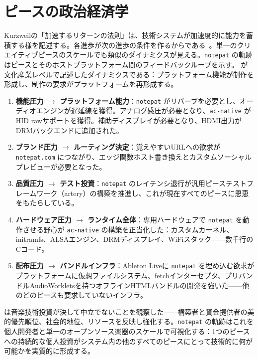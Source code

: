 \documentclass[10pt,letterpaper,twocolumn]{article}
\begin{document}
\section{ピースの政治経済学}

Kurzweilの「加速するリターンの法則」は、技術システムが加速度的に能力を蓄積する様を記述する。各進歩が次の進歩の条件を作るからである~\citep{kurzweil2005singularity}。単一のクリエイティブピースのスケールでも類似のダイナミクスが見える。\texttt{notepat} の軌跡はピースとそのホストプラットフォーム間のフィードバックループを示す。\citet{nieborg2018platformization} が文化産業レベルで記述したダイナミクスである：プラットフォーム機能が制作を形成し、制作の要求がプラットフォームを再形成する。

\begin{enumerate}
  \item \textbf{機能圧力 $\rightarrow$ プラットフォーム能力}：\texttt{notepat} がリバーブを必要とし、オーディオエンジンが遅延線を獲得。アナログ感圧が必要となり、\texttt{ac-native} がHID rawサポートを獲得。補助ディスプレイが必要となり、HDMI出力がDRMバックエンドに追加された。
  \item \textbf{ブランド圧力 $\rightarrow$ ルーティング決定}：覚えやすいURLへの欲求が \texttt{notepat.com} につながり、エッジ関数ホスト書き換えとカスタムソーシャルプレビューが必要となった。
  \item \textbf{品質圧力 $\rightarrow$ テスト投資}：\texttt{notepat} のレイテンシ退行が汎用ピーステストフレームワーク（artery）の構築を推進し、これが現在すべてのピースに恩恵をもたらしている。
  \item \textbf{ハードウェア圧力 $\rightarrow$ ランタイム全体}：専用ハードウェアで \texttt{notepat} を動作させる野心が \texttt{ac-native} の構築を正当化した：カスタムカーネル、initramfs、ALSAエンジン、DRMディスプレイ、WiFiスタック——数千行のCコード。
  \item \textbf{配布圧力 $\rightarrow$ バンドルインフラ}：Ableton Liveに \texttt{notepat} を埋め込む欲求がプラットフォームに仮想ファイルシステム、fetchインターセプタ、プリバンドルAudioWorkletsを持つオフラインHTMLバンドルの開発を強いた——他のどのピースも要求していないインフラ。
\end{enumerate}

\citet{born2015music} は音楽技術投資が決して中立でないことを観察した——構築者と資金提供者の美的優先順位、社会的地位、リソースを反映し強化する。\texttt{notepat} の軌跡はこれを個人開発者と単一のオープンソース楽器のスケールで可視化する：1つのピースへの持続的な個人投資がシステム内の他のすべてのピースにとって技術的に何が可能かを実質的に形成する。
\end{document}
